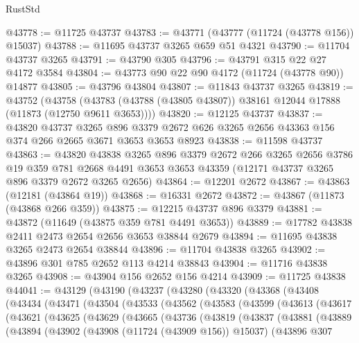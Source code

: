 \begin{lexlean}{RustStd}
\begin{coremodule}
@43778 := @11725 @43737
@43783 := @43771 (@43777 (@11724 (@43778 @156)) @15037)
@43788 := @11695 @43737 @3265 @659 @51 @4321
@43790 := @11704 @43737 @3265
@43791 := @43790 @305
@43796 := @43791 @315 @22 @27 @4172 @3584
@43804 := @43773 @90 @22 @90 @4172 (@11724 (@43778 @90)) @14877
@43805 := @43796 @43804
@43807 := @11843 @43737 @3265
@43819 := @43752
    (@43758 (@43783 (@43788 (@43805 @43807)) @38161 @12044 @17888 (@11873 (@12750 @9611 @3653))))
@43820 := @12125 @43737
@43837 := @43820
    @43737
    @3265
    @896
    @3379
    @2672
    @626
    @3265
    @2656
    @43363
    @156
    @374
    @266
    @2665
    @3671
    @3653
    @3653
    @8923
@43838 := @11598 @43737
@43863 := @43820
    @43838
    @3265
    @896
    @3379
    @2672
    @266
    @3265
    @2656
    @3786
    @19
    @359
    @781
    @2668
    @4491
    @3653
    @3653
    @43359
    (@12171 @43737 @3265 @896 @3379 @2672 @3265 @2656)
@43864 := @12201 @2672
@43867 := @43863 (@12181 (@43864 @19))
@43868 := @16331 @2672
@43872 := @43867 (@11873 (@43868 @266 @359))
@43875 := @12215 @43737 @896 @3379
@43881 := @43872 (@11649 (@43875 @359 @781 @4491 @3653))
@43889 := @17782 @43838 @2411 @2473 @2654 @2656 @3653 @38844 @2679
@43894 := @11695 @43838 @3265 @2473 @2654 @38844
@43896 := @11704 @43838 @3265
@43902 := @43896 @301 @785 @2652 @113 @4214 @38843
@43904 := @11716 @43838 @3265
@43908 := @43904 @156 @2652 @156 @4214
@43909 := @11725 @43838
@44041 := @43129
    (@43190
      (@43237
        (@43280
          (@43320
            (@43368
              (@43408
                (@43434
                  (@43471
                    (@43504
                      (@43533
                        (@43562
                          (@43583
                            (@43599
                              (@43613
                                (@43617
                                  (@43621
                                    (@43625
                                      (@43629
                                        (@43665
                                          (@43736
                                            (@43819
                                              (@43837
                                                (@43881
                                                  (@43889
                                                    (@43894
                                                      (@43902
                                                        (@43908 (@11724 (@43909 @156)) @15037)
                                                        (@43896
                                                          @307

\end{coremodule}
\end{lexlean}
